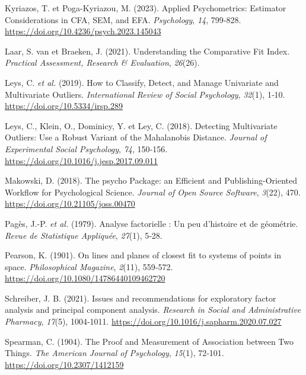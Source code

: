 \documentclass[
  french,
  11pt,
  a4paper,
]{article}
\newlength{\cslhangindent}
\newenvironment{CSLReferences}[2] %
 {\begin{list}{}{%
  \setlength{\itemindent}{0pt}
  \setlength{\leftmargin}{0pt}
  \setlength{\parsep}{0pt}
  \ifodd #1
   \setlength{\leftmargin}{\cslhangindent}
   \setlength{\itemindent}{-1\cslhangindent}
  \fi
  \setlength{\itemsep}{#2\baselineskip}}}
 {\end{list}}
\begin{document}
\begin{CSLReferences}{1}{0}
Kyriazos, T. et Poga-Kyriazou, M. (2023). Applied Psychometrics:
Estimator Considerations in CFA, SEM, and EFA. \emph{Psychology},
\emph{14}, 799‑828. \url{https://doi.org/10.4236/psych.2023.145043}

Laar, S. van et Braeken, J. (2021). Understanding the Comparative Fit
Index. \emph{Practical Assessment, Research \& Evaluation},
\emph{26}(26).

{Leys, C. \emph{et al.}} (2019). How to Classify, Detect, and Manage
Univariate and Multivariate Outliers. \emph{International Review of
Social Psychology}, \emph{32}(1), 1‑10.
\url{https://doi.org/10.5334/irsp.289}

Leys, C., Klein, O., Dominicy, Y. et Ley, C. (2018). Detecting
Multivariate Outliers: Use a Robust Variant of the Mahalanobis Distance.
\emph{Journal of Experimental Social Psychology}, \emph{74}, 150‑156.
\url{https://doi.org/10.1016/j.jesp.2017.09.011}

Makowski, D. (2018). The psycho Package: an Efficient and
Publishing-Oriented Workflow for Psychological Science. \emph{Journal of
Open Source Software}, \emph{3}(22), 470.
\url{https://doi.org/10.21105/joss.00470}

{Pagès, J.-P. \emph{et al.}} (1979). Analyse factorielle : Un peu
d'histoire et de géométrie. \emph{Revue de Statistique Appliqu{é}e},
\emph{27}(1), 5‑28.

Pearson, K. (1901). On lines and planes of closest fit to systems of
points in space. \emph{Philosophical Magazine}, \emph{2}(11), 559‑572.
\url{https://doi.org/10.1080/14786440109462720}

Schreiber, J. B. (2021). Issues and recommendations for exploratory
factor analysis and principal component analysis. \emph{Research in
Social and Administrative Pharmacy}, \emph{17}(5), 1004‑1011.
\url{https://doi.org/10.1016/j.sapharm.2020.07.027}

Spearman, C. (1904). The Proof and Measurement of Association between
Two Things. \emph{The American Journal of Psychology}, \emph{15}(1),
72‑101. \url{https://doi.org/10.2307/1412159}


\end{CSLReferences}
\end{document}
